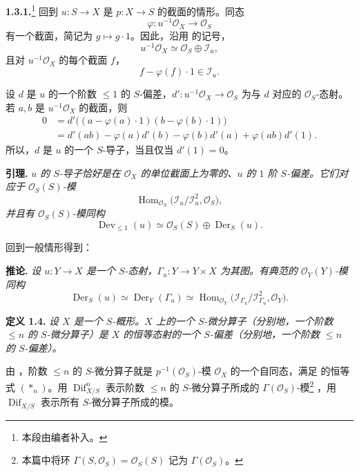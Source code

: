 \medskip
\noindent\textbf{1.3.1.}\footnote{本段由编者补入。}
\label{sga3:VIIA:1.3.1}
回到 \(u:S\to X\) 是 \(p:X\to S\) 的截面的情形。同态
\[
 \varphi:u^{-1}\mathcal O_X\longrightarrow\mathcal O_S
\]
有一个截面，简记为 \(g\mapsto g\cdot1\)。因此，沿用  的记号，
\[
  u^{-1}\mathcal O_X\simeq\mathcal O_S\oplus\mathcal I_u,
\]
且对 \(u^{-1}\mathcal O_X\) 的每个截面 \(f\)，
\[
  f-\varphi(f)\cdot1\in\mathcal I_u.
\]

设 \(d\) 是 \(u\) 的一个阶数 \(\leq1\) 的 \(S\)-偏差，\(d':u^{-1}\mathcal O_X\to\mathcal O_S\) 为与 \(d\) 对应的 \(\mathcal O_S\)-态射。若 \(a,b\) 是 \(u^{-1}\mathcal O_X\) 的截面，则
\begin{align*}
0
 &=d'\bigl((a-\varphi(a)\cdot1)(b-\varphi(b)\cdot1)\bigr)\\
 &=d'(ab)-\varphi(a)d'(b)-\varphi(b)d'(a)+\varphi(ab)d'(1).
\end{align*}
所以，\(d\) 是 \(u\) 的一个 \(S\)-导子，当且仅当 \(d'(1)=0\)。

\medskip
\noindent\textbf{引理.}
\label{sga3:VIIA:1.3.1-derivation-lemma}
\textit{\(u\) 的 \(S\)-导子恰好是在 \(\mathcal O_X\) 的单位截面上为零的、\(u\) 的 \(1\) 阶 \(S\)-偏差。它们对应于 \(\mathcal O_S(S)\)-模}
\[
  \operatorname{Hom}_{\mathcal O_S}
  \bigl(\mathcal I_u/\mathcal I_u^2,\mathcal O_S\bigr),
\]
\textit{并且有 \(\mathcal O_S(S)\)-模同构}
\[
 \operatorname{Dev}_{\leq1}(u)
 \simeq
 \mathcal O_S(S)\oplus\operatorname{Der}_S(u).
\]

回到一般情形得到：

\medskip
\noindent\textbf{推论.}
\label{sga3:VIIA:1.3.1-graph-corollary}
\textit{设 \(u:Y\to X\) 是一个 \(S\)-态射，\(\Gamma_u:Y\to Y\times X\) 为其图。有典范的 \(\mathcal O_Y(Y)\)-模同构}
\[
 \operatorname{Der}_S(u)
 \simeq
 \operatorname{Der}_Y(\Gamma_u)
 \simeq
 \operatorname{Hom}_{\mathcal O_Y}
 \bigl(\mathcal I_{\Gamma_u}/\mathcal I_{\Gamma_u}^2,\mathcal O_Y\bigr).
\]

\medskip
\noindent\textbf{定义 1.4.}
\label{sga3:VIIA:1.4}
\textit{设 \(X\) 是一个 \(S\)-概形。\(X\) 上的一个 \(S\)-微分算子（分别地，一个阶数 \(\leq n\) 的 \(S\)-微分算子）是 \(X\) 的恒等态射的一个 \(S\)-偏差（分别地，一个阶数 \(\leq n\) 的 \(S\)-偏差）。}

由 ，阶数 \(\leq n\) 的 \(S\)-微分算子就是 \(p^{-1}(\mathcal O_S)\)-模 \(\mathcal O_X\) 的一个自同态，满足  的恒等式 \((\ast_n)\)。用 \(\operatorname{Dif}^n_{X/S}\) 表示阶数 \(\leq n\) 的 \(S\)-微分算子所成的 \(\Gamma(\mathcal O_S)\)-模\footnote{本篇中将环 \(\Gamma(S,\mathcal O_S)=\mathcal O_S(S)\) 记为 \(\Gamma(\mathcal O_S)\)。}
，用 \(\operatorname{Dif}_{X/S}\) 表示所有 \(S\)-微分算子所成的模。

